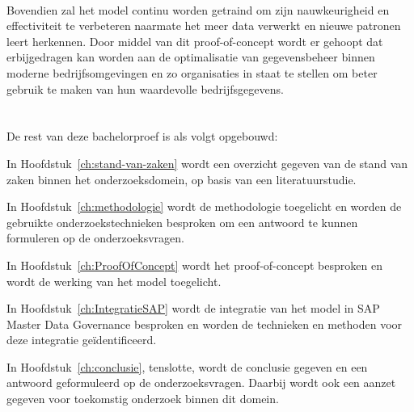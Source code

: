 \\
Bovendien zal het model continu worden getraind om zijn nauwkeurigheid en effectiviteit te verbeteren naarmate het meer data verwerkt en nieuwe patronen leert herkennen. Door middel van dit proof-of-concept wordt er gehoopt dat erbijgedragen kan worden aan de optimalisatie van gegevensbeheer binnen moderne bedrijfsomgevingen en zo organisaties in staat te stellen om beter gebruik te maken van hun waardevolle bedrijfsgegevens.

\section{}%
\label{sec:opzet-bachelorproef}


De rest van deze bachelorproef is als volgt opgebouwd:

In Hoofdstuk~\ref{ch:stand-van-zaken} wordt een overzicht gegeven van de stand van zaken binnen het onderzoeksdomein, op basis van een literatuurstudie.

In Hoofdstuk~\ref{ch:methodologie} wordt de methodologie toegelicht en worden de gebruikte onderzoekstechnieken besproken om een antwoord te kunnen formuleren op de onderzoeksvragen.

In Hoofdstuk~\ref{ch:ProofOfConcept} wordt het proof-of-concept besproken en wordt de werking van het model toegelicht.

In Hoofdstuk~\ref{ch:IntegratieSAP} wordt de integratie van het model in SAP Master Data Governance besproken en worden de technieken en methoden voor deze integratie geïdentificeerd.

In Hoofdstuk~\ref{ch:conclusie}, tenslotte, wordt de conclusie gegeven en een antwoord geformuleerd op de onderzoeksvragen. Daarbij wordt ook een aanzet gegeven voor toekomstig onderzoek binnen dit domein.